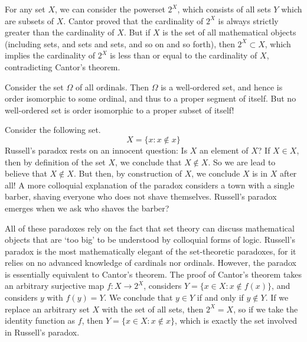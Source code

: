 \begin{example}
    For any set $X$, we can consider the powerset $2^X$, which consists of all sets $Y$ which are subsets of $X$. Cantor proved that the cardinality of $2^X$ is always strictly greater than the cardinality of $X$. But if $X$ is the set of all mathematical objects (including sets, and sets and sets, and so on and so forth), then $2^X \subset X$, which implies the cardinality of $2^X$ is less than or equal to the cardinality of $X$, contradicting Cantor's theorem.
\end{example}

\begin{example}
    Consider the set $\Omega$ of all ordinals. Then $\Omega$ is a well-ordered set, and hence is order isomorphic to some ordinal, and thus to a proper segment of itself. But no well-ordered set is order isomorphic to a proper subset of itself!
\end{example}

\begin{example}
    Consider the following set.
    \[ X = \{ x: x \not \in x \} \]
    Russell's paradox rests on an innocent question: Is $X$ an element of $X$? If $X \in X$, then by definition of the set $X$, we conclude that $X \not \in X$. So we are lead to believe that $X \not \in X$. But then, by construction of $X$, we conclude $X$ is in $X$ after all! A more colloquial explanation of the paradox considers a town with a single barber, shaving everyone who does not shave themselves. Russell's paradox emerges when we ask who shaves the barber?
\end{example}

All of these paradoxes rely on the fact that set theory can discuss mathematical objects that are `too big' to be understood by colloquial forms of logic. Russell's paradox is the most mathematically elegant of the set-theoretic paradoxes, for it relies on no advanced knowledge of cardinals nor ordinals. However, the paradox is essentially equivalent to Cantor's theorem. The proof of Cantor's theorem takes an arbitrary surjective map $f: X \to 2^X$, considers $Y = \{ x \in X: x \not \in f(x) \}$, and considers $y$ with $f(y) = Y$. We conclude that $y \in Y$ if and only if $y \not \in Y$. If we replace an arbitrary set $X$ with the set of all sets, then $2^X = X$, so if we take the identity function as $f$, then $Y = \{ x \in X : x \not \in x \}$, which is exactly the set involved in Russell's paradox.

